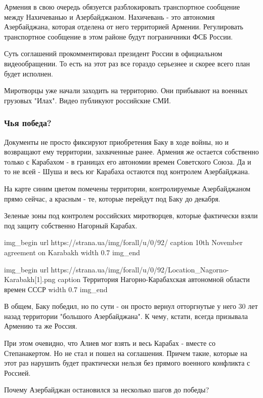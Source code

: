 Армения в свою очередь обязуется разблокировать транспортное сообщение между Нахичеванью и Азербайджаном. Нахичевань - это автономия Азербайджана, которая отделена от него территорией Армении. Регулировать транспортное сообщение в этом районе будут пограничники ФСБ России. 

Суть соглашений прокомментировал президент России в официальном видеообращении. То есть на этот раз все гораздо серьезнее и скорее всего план будет исполнен. 

Миротворцы уже начали заходить на территорию. Они прибывают на военных грузовых "Илах". Видео публикуют российские СМИ. 

\subsubsection{Чья победа?}

Документы не просто фиксируют приобретения Баку в ходе войны, но и возвращают
ему территории, захваченные ранее. Армения же остается собственно только с
Карабахом - в границах его автономии времен Советского Союза. Да и то не всей -
Шуша и весь юг Карабаха остаются под контролем Азербайджана.

На карте синим цветом помечены территории, контролируемые Азербайджаном прямо
сейчас, а красным - те, которые перейдут под Баку до декабря.

Зеленые зоны под контролем российских миротворцев, которые фактически взяли под
защиту собственно Нагорный Карабах.

\ifcmt
img_begin 
	url https://strana.ua/img/forall/u/0/92/%
	caption 10th November agreement on Karabakh
	width 0.7
img_end
\fi

\ifcmt
img_begin 
	url https://strana.ua/img/forall/u/0/92/Location_Nagorno-Karabakh[1].png
	caption Территория Нагорно-Карабахская автономной области времен СССР
	width 0.7
img_end
\fi

В общем, Баку победил, но по сути - он просто вернул отторгнутые у него 30 лет
назад территории "большого Азербайджана". К чему, кстати, всегда призывала
Армению та же Россия. 

При этом очевидно, что Алиев мог взять и весь Карабах - вместе со
Степанакертом. Но не стал и пошел на соглашения. Причем такие, которые на этот
раз нарушить будет практически нельзя без прямого военного конфликта с Россией. 

Почему Азербайджан остановился за несколько шагов до победы? 

